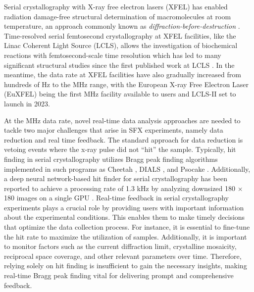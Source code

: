 \documentclass[a4paper]{article}
\newcommand{\psocake}{Psocake}
\begin{document}
Serial crystallography with X-ray free electron lasers (XFEL) has enabled radiation damage-free structural determination of macromolecules at room temperature, an approach commonly known as \textit{diffraction-before-destruction} \citep{neutzePotentialBiomolecularImaging2000, chapmanFemtosecondDiffractiveImaging2006,chapmanFemtosecondXrayProtein2011}.  Time-resolved serial femtosecond crystallography at XFEL facilities, like the Linac Coherent Light Source (LCLS), allows the investigation of biochemical reactions with femtosecond-scale time resolution which has led to many significant structural studies \citep{kupitzSerialTimeresolvedCrystallography2014, nangoThreedimensionalMovieStructural2016,pandeFemtosecondStructuralDynamics2016a, youngStructurePhotosystemII2016,sugaLightinducedStructuralChanges2017, kernStructuresIntermediatesKok2018,ibrahimUntanglingSequenceEvents2020, sugaTimeresolvedStudiesMetalloproteins2020} since the first published work at LCLS \citep{aquilaTimeresolvedProteinNanocrystallography2012}.  In the meantime, the data rate at XFEL facilities have also gradually increased from hundreds of Hz to the MHz range, with the European X-ray Free Electron Laser (EuXFEL) being the first MHz facility available to users and LCLS-II set to launch in 2023.  

At the MHz data rate, novel real-time data analysis approaches are needed to tackle two major challenges that arise in SFX experiments, namely data reduction and real time feedback.  The standard approach for data reduction is vetoing events where the x-ray pulse did not ``hit'' the sample. Typically, hit finding in serial crystallography utilizes Bragg peak finding algorithms implemented in such programs as Cheetah  \citep{bartyCheetahSoftwareHighthroughput2014}, DIALS \citep{winterDIALSImplementationEvaluation2018}, and \psocake{} \citep{yoonPsocakeGUIMaking2020}.  Additionally, a deep neural network-based hit finder for serial crystallography has been reported to achieve a processing rate of 1.3 kHz by analyzing downsized 180 $\times$ 180 images on a single GPU \citep{keConvolutionalNeuralNetworkbased2018}.  Real-time feedback in serial crystallography experiments plays a crucial role by providing users with important information about the experimental conditions.  This enables them to make timely decisions that optimize the data collection process. For instance, it is essential to fine-tune the hit rate to maximize the utilization of samples. Additionally, it is important to monitor factors such as the current diffraction limit, crystalline mosaicity, reciprocal space coverage, and other relevant parameters over time. Therefore, relying solely on hit finding is insufficient to gain the necessary insights, making real-time Bragg peak finding vital for delivering prompt and comprehensive feedback.
\end{document}

